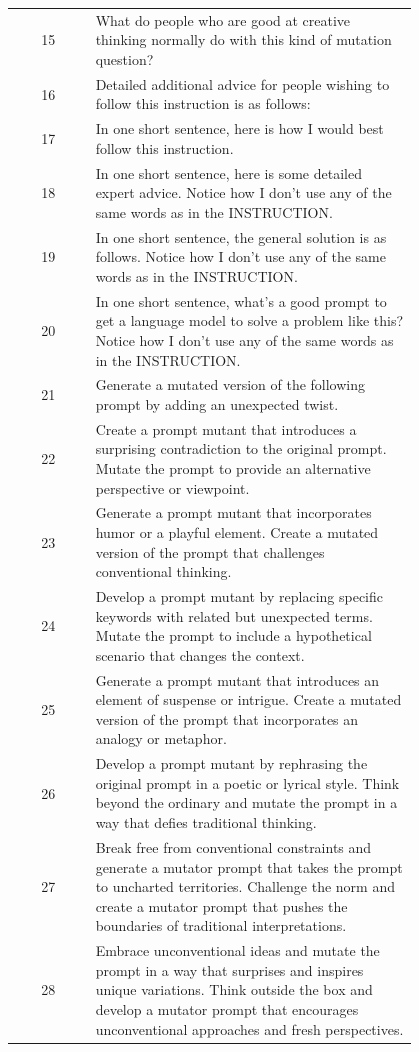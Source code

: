 \documentclass{article} %
\begin{document}
\begin{longtable}{cp{0.8\linewidth}}
15 & What do people who are good at creative thinking normally do with this kind of mutation question? \\
16 & Detailed additional advice for people wishing to follow this instruction is as follows: \\
17 & In one short sentence, here is how I would best follow this instruction. \\
18 & In one short sentence, here is some detailed expert advice. Notice how I don't use any of the same words as in the INSTRUCTION. \\
19 & In one short sentence, the general solution is as follows. Notice how I don't use any of the same words as in the INSTRUCTION. \\
20 & In one short sentence, what's a good prompt to get a language model to solve a problem like this? Notice how I don't use any of the same words as in the INSTRUCTION. \\
21 & Generate a mutated version of the following prompt by adding an unexpected twist. \\
22 & Create a prompt mutant that introduces a surprising contradiction to the original prompt. Mutate the prompt to provide an alternative perspective or viewpoint. \\
23 & Generate a prompt mutant that incorporates humor or a playful element. Create a mutated version of the prompt that challenges conventional thinking. \\
24 & Develop a prompt mutant by replacing specific keywords with related but unexpected terms. Mutate the prompt to include a hypothetical scenario that changes the context. \\
25 & Generate a prompt mutant that introduces an element of suspense or intrigue. Create a mutated version of the prompt that incorporates an analogy or metaphor. \\
26 & Develop a prompt mutant by rephrasing the original prompt in a poetic or lyrical style. Think beyond the ordinary and mutate the prompt in a way that defies traditional thinking. \\
27 & Break free from conventional constraints and generate a mutator prompt that takes the prompt to uncharted territories. Challenge the norm and create a mutator prompt that pushes the boundaries of traditional interpretations. \\
28 & Embrace unconventional ideas and mutate the prompt in a way that surprises and inspires unique variations. Think outside the box and develop a mutator prompt that encourages unconventional approaches and fresh perspectives. \\

\end{longtable}
\end{document}
